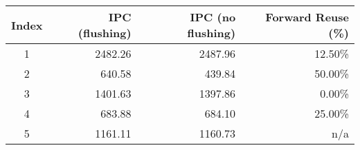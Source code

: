 \begin{tabular}{|c|r|r|r|}
  \hline
    \textbf{Index} & \textbf{IPC (flushing)} & \textbf{IPC (no flushing)} & \textbf{Forward Reuse (\%)} \\
  \hline
  \hline
    1 & 2482.26 & 2487.96 & 12.50\% \\
    2 & 640.58 & 439.84 & 50.00\% \\
    3 & 1401.63 & 1397.86 & 0.00\% \\
    4 & 683.88 & 684.10 & 25.00\% \\
    5 & 1161.11 & 1160.73 & n/a \\
  \hline
\end{tabular}

